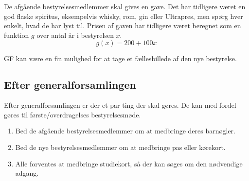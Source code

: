 De afgående bestyrelsesmedlemmer skal gives en gave. 
Det har tidligere været en god flaske spiritus, 
eksempelvis whisky, rom, gin eller Ultrapres,
men spørg hver enkelt, hvad de har lyst til.
Prisen af gaven har tidligere været beregnet som 
en funktion $g$ over antal år i bestyrelsen $x$.
$$g(x) = 200 + 100x$$

GF kan være en fin mulighed for at tage et fællesbillede af den nye
bestyrelse.

\subsection{Efter generalforsamlingen}

Efter generalforsamlingen er der et par ting der skal gøres. De kan med fordel gøres
til første/overdragelses bestyrelsesmøde.

\begin{enumerate}
    \item[!] Bed de afgående bestyrelsesmedlemmer om at medbringe deres barnøgler.
    \item[!] Bed de nye bestyrelsesmedlemmer om at medbringe pas eller kørekort.
    \item[!] Alle forventes at medbringe studiekort, så der kan søges om den nødvendige adgang.
\end{enumerate}

